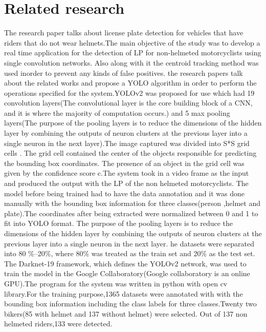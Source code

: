 \section{Related research}
\big[1\big]
The research paper talks about license plate detection for vehicles that have riders that do not wear helmets.The main objective of the study was to develop a real time application for the detection of LP for non-helmeted motorcyclists using single convolution networks. Also along with it the centroid tracking method was used inorder to prevent any kinds of false positives.
the research papers talk about the related works and propose a \ac{YOLO} algorithm in order to perform the operations specified for the system.\ac{YOLO}v2 was proposed for use which had 19 convolution layers(The convolutional layer is the core building block of a \ac{CNN}, and it is where the majority of computation occurs.) and 5 max pooling layers(The purpose of the pooling layers is to reduce the dimensions of the hidden layer by combining the outputs of neuron clusters at the previous layer into a single neuron in the next layer).The image captured was divided into S*S grid cells . The grid cell contained the center of the objects responsible for predicting the bounding box coordinates. The presence of an object in the grid cell was given by the confidence score c.The system took in a video frame as the input and produced the output with the \ac{LP} of the non helmeted motorcyclists.
The model before being trained had to have the data annotation and it was done manually with the bounding box information for three classes(person ,helmet and plate).The coordinates after being extracted were normalized between 0 and 1 to fit into YOLO format.
The purpose of the pooling layers is to reduce the dimensions of the hidden layer by combining the outputs of neuron clusters at the previous layer into a single neuron in the next layer.
he datasets were separated into 80 \%–20\%, where 80\% was treated as the train set and
20\% as the test set. The Darknet-19 framework, which defines the YOLOv2 network, was used to train the model in
the Google Collaboratory(Google collaboratory is an online \ac{GPU}).The program for the system was written in python with open cv library.For the training purpose,1365 datasets were annotated with  with the bounding box information including the class labels for three classes.Twenty two bikers(85 with helmet and 137 without helmet) were selected. Out of 137 non helmeted riders,133 were detected.
\\
\\
